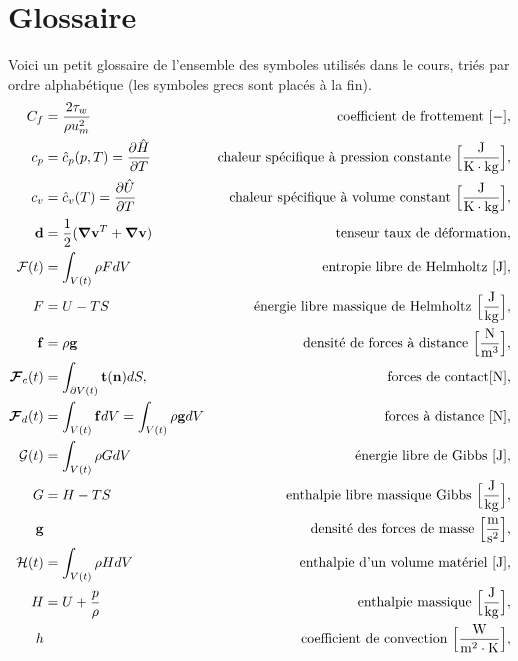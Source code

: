 
\chapter{Glossaire}
  Voici un petit glossaire de l'ensemble des symboles utilisés dans le cours, triés par ordre alphabétique (les symboles grecs sont placés à la fin).
  \begingroup
    \allowdisplaybreaks
    \begin{align*}
      C_f &= \frac{2\tau_w}{\rho u_m^2} & \textrm{coefficient de frottement } [-],\\
      c_p &= \hat{c}_p(p,T) = \pdv{\hat{H}}{T} & \textrm{chaleur spécifique à pression constante } \Big[\si{\frac{J}{K \cdot kg}}\Big],\\
      c_v &= \hat{c}_v (T) = \pdv{\hat{U}}{T} & \textrm{chaleur spécifique à volume constant } \Big[\si{\frac{J}{K \cdot kg}}\Big],\\
      \vb{d} &= \recip{2}(\grad\vb{v}^T + \grad\vb{v}) & \textrm{tenseur taux de déformation},\\
      \mathcal{F}(t) &= \int_{V(t)} \rho F dV & \textrm{entropie libre de Helmholtz } [\si{J}],\\
      F &= U - TS & \textrm{énergie libre massique de Helmholtz } \Big[\si{\frac{J}{kg}}\Big],\\
      \vb{f} &= \rho \vb{g} & \textrm{densité de forces à distance } \Big[\si{\frac{N}{m^3}}\Big], \\
      \bs{\mathcal{F}}_c (t) &= \int_{\partial V(t)} \vb{t}(\vb{n}) dS, & \textrm{forces de contact} [\si{N}],\\
      \bs{\mathcal{F}}_d (t) &= \int_{V(t)} \vb{f} dV = \int_{V(t)} \rho \vb{g} dV & \textrm{forces à distance } [\si{N}],\\
      \mathcal{G}(t) &= \int_{V(t)} \rho G dV & \textrm{énergie libre de Gibbs } [\si{J}],\\
      G &= H -TS & \textrm{enthalpie libre massique Gibbs } \Big[\si{\frac{J}{kg}}\Big],\\
      \vb{g} & & \textrm {densité des forces de masse } \Big[\si{\frac{m}{s^2}}\Big],\\
      \mathcal{H}(t) &= \int_{V(t)} \rho H dV & \textrm{enthalpie d'un volume matériel } [\si{J}],\\
      H &= U + \frac{p}{\rho} & \textrm{enthalpie massique } \Big[\si{\frac{J}{kg}}\Big],\\
      h & & \textrm{coefficient de convection } \Big[\si{\frac{W}{m^2 \cdot K}}\Big], \\

\end{align*}

